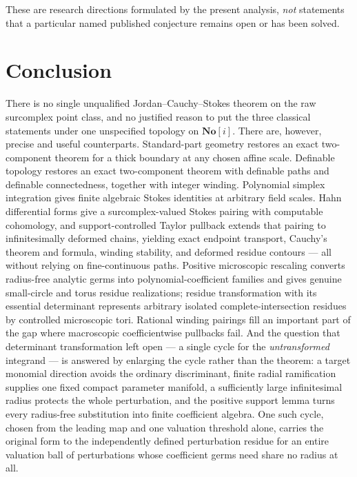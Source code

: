 \documentclass[11pt,letterpaper]{article}
\theoremstyle{definition}
\theoremstyle{remark}
\newcommand{\No}{\mathbf{No}}\newcommand{\SC}{\mathbf{SC}}
\numberwithin{equation}{section}
\begin{document}
These are research directions formulated by the present analysis, \emph{not}
statements that a particular named published conjecture remains open or has been
solved.

\section{Conclusion}
\label{contours:sec:conclusion}

There is no single unqualified Jordan--Cauchy--Stokes theorem on the raw surcomplex
point class, and no justified reason to put the three classical statements under one
unspecified topology on $\No[i]$. There are, however, precise and useful
counterparts. Standard-part geometry restores an exact two-component theorem for a
thick boundary at any chosen affine scale. Definable topology restores an exact
two-component theorem with definable paths and definable connectedness, together
with integer winding. Polynomial simplex integration gives finite algebraic Stokes
identities at arbitrary field scales. Hahn differential forms give a
surcomplex-valued Stokes pairing with computable cohomology, and support-controlled
Taylor pullback extends that pairing to infinitesimally deformed chains, yielding
exact endpoint transport, Cauchy's theorem and formula, winding stability, and
deformed residue contours --- all without relying on fine-continuous paths. Positive
microscopic rescaling converts radius-free analytic germs into polynomial-coefficient
families and gives genuine small-circle and torus residue realizations; residue
transformation with its essential determinant represents arbitrary isolated
complete-intersection residues by controlled microscopic tori. Rational winding
pairings fill an important part of the gap where macroscopic coefficientwise
pullbacks fail. And the question that determinant transformation left open --- a
single cycle for the \emph{untransformed} integrand --- is answered by enlarging
the cycle rather than the theorem: a target monomial direction avoids the
ordinary discriminant, finite radial ramification supplies one fixed compact
parameter manifold, a sufficiently large infinitesimal radius protects the whole
perturbation, and the positive support lemma turns every radius-free
substitution into finite coefficient algebra. One such cycle, chosen from the
leading map and one valuation threshold alone, carries the original form to the
independently defined perturbation residue for an entire valuation ball of
perturbations whose coefficient germs need share no radius at all.
\end{document}

